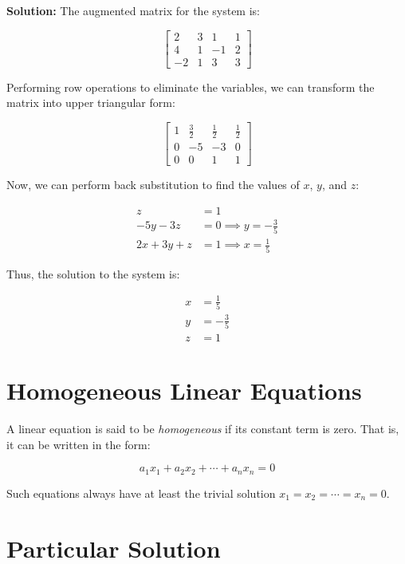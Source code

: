 \textbf{Solution:} The augmented matrix for the system is:

\[
    \left[
    \begin{array}{ccc|c}
        2  & 3 & 1  & 1 \\
        4  & 1 & -1 & 2 \\
        -2 & 1 & 3  & 3
    \end{array}
    \right]
\]

Performing row operations to eliminate the variables, we can transform the matrix into upper triangular form:

\[
    \left[
    \begin{array}{ccc|c}
        1 & \frac{3}{2} & \frac{1}{2} & \frac{1}{2} \\
        0 & -5          & -3          & 0           \\
        0 & 0           & 1           & 1
    \end{array}
    \right]
\]

Now, we can perform back substitution to find the values of \(x\), \(y\), and \(z\):

\begin{align*}
    z           & = 1                           \\
    -5y - 3z    & = 0 \implies y = -\frac{3}{5} \\
    2x + 3y + z & = 1 \implies x = \frac{1}{5}
\end{align*}

Thus, the solution to the system is:

\begin{align*}
    x & = \frac{1}{5}  \\
    y & = -\frac{3}{5} \\
    z & = 1
\end{align*}

\section{Homogeneous Linear Equations}

A linear equation is said to be \emph{homogeneous} if its constant term is zero. That is, it
can be written in the form:

\[
    a_1 x_1 + a_2 x_2 + \cdots + a_n x_n = 0
\]

Such equations always have at least the trivial solution \(x_1 = x_2 = \cdots = x_n = 0\).

\section{Particular Solution}

